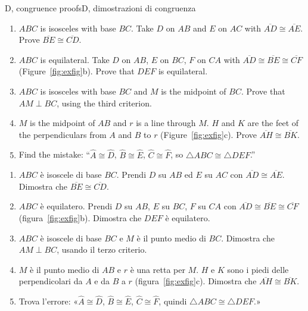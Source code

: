\documentclass[10pt,a4paper,oneside]{book}
\newcommand{\av}[1]{\widehat{#1}}           %
\newcommand{\seg}[1]{\overline{#1}}         %
\newcommand{\tri}[1]{\triangle #1}          %
\begin{document}
\begin{exercise}{D, congruence proofs}{D, dimostrazioni di congruenza}
\begin{enumerate}[label=\textbf{D\arabic*.}, leftmargin=2.2em]
\item $ABC$ is isosceles with base $BC$. Take $D$ on $AB$ and $E$ on $AC$ with $\seg{AD} \cong \seg{AE}$. Prove $\seg{BE} \cong \seg{CD}$.
\item $ABC$ is equilateral. Take $D$ on $AB$, $E$ on $BC$, $F$ on $CA$ with $\seg{AD} \cong \seg{BE} \cong \seg{CF}$ (Figure~\ref{fig:exfig}b). Prove that $DEF$ is equilateral.
\item $ABC$ is isosceles with base $BC$ and $M$ is the midpoint of $BC$. Prove that $AM \perp BC$, using the third criterion.
\item $M$ is the midpoint of $AB$ and $r$ is a line through $M$. $H$ and $K$ are the feet of the perpendiculars from $A$ and $B$ to $r$ (Figure~\ref{fig:exfig}c). Prove $\seg{AH} \cong \seg{BK}$.
\item Find the mistake: ``$\av{A} \cong \av{D}$, $\av{B} \cong \av{E}$, $\av{C} \cong \av{F}$, so $\tri{ABC} \cong \tri{DEF}$.''
\end{enumerate}
\tcblower
\begin{enumerate}[label=\textbf{D\arabic*.}, leftmargin=2.2em]
\item $ABC$ è isoscele di base $BC$. Prendi $D$ su $AB$ ed $E$ su $AC$ con $\seg{AD} \cong \seg{AE}$. Dimostra che $\seg{BE} \cong \seg{CD}$.
\item $ABC$ è equilatero. Prendi $D$ su $AB$, $E$ su $BC$, $F$ su $CA$ con $\seg{AD} \cong \seg{BE} \cong \seg{CF}$ (figura~\ref{fig:exfig}b). Dimostra che $DEF$ è equilatero.
\item $ABC$ è isoscele di base $BC$ e $M$ è il punto medio di $BC$. Dimostra che $AM \perp BC$, usando il terzo criterio.
\item $M$ è il punto medio di $AB$ e $r$ è una retta per $M$. $H$ e $K$ sono i piedi delle perpendicolari da $A$ e da $B$ a $r$ (figura~\ref{fig:exfig}c). Dimostra che $\seg{AH} \cong \seg{BK}$.
\item Trova l'errore: «$\av{A} \cong \av{D}$, $\av{B} \cong \av{E}$, $\av{C} \cong \av{F}$, quindi $\tri{ABC} \cong \tri{DEF}$.»
\end{enumerate}
\end{exercise}
\end{document}
